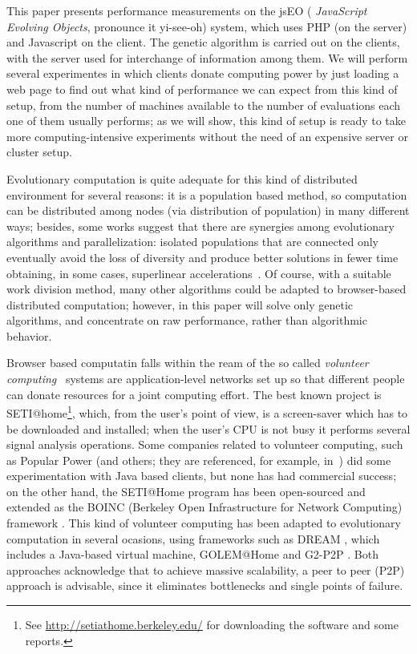 \documentclass{llncs}
\begin{document}
This paper presents performance measurements on the jsEO ({\em
  JavaScript Evolving Objects}, pronounce it yi-see-oh) system, which uses PHP 
 (on the server) and Javascript on the client. The genetic algorithm is carried out  on the clients,
with the server used  for interchange of information among
them. We will perform several experimentes in which clients donate
computing power by just loading a web page to find out what kind of
performance we can expect from this kind of setup, from the number of
machines available to the number of evaluations each one of them
usually performs; as we will show, this kind of setup is ready to take more
computing-intensive experiments without the need of an expensive server or cluster
setup. 

Evolutionary computation is quite adequate for this
kind of distributed environment for several reasons: it is a population based method,
so computation can be distributed among nodes (via distribution of
population) in many different ways;
besides, some works suggest that there are synergies among evolutionary
algorithms and parallelization: isolated populations that are
connected only eventually avoid the loss of diversity and produce
better solutions in fewer time obtaining, in some cases, superlinear
accelerations~\cite{cantu-paz:migration-policies}. Of course, with a suitable work division method, many other algorithms
could be adapted to browser-based distributed computation; however, in
this paper will solve only genetic algorithms, and concentrate on raw
performance, rather than algorithmic behavior. 

Browser based computatin falls within the ream of the so called  {\em volunteer
computing}~\cite{sarmenta-bayanihan,hpvc} systems are
application-level networks set up so that different people
can donate resources for a joint computing  effort.
The best known project is SETI@home\footnote{See
\url{http://setiathome.berkeley.edu/} for downloading the software  and some
reports.}, which, from the user's point of view, is a screen-saver which has to be
downloaded and installed; when the user's CPU is not busy it performs
several signal analysis operations.
Some companies related to volunteer computing, such as Popular Power (and
others; they are referenced,
for example, in~\cite{Cappello}) did some experimentation with Java based
clients, but none has had commercial success; on the other hand, the
SETI@Home program has been open-sourced and extended as the BOINC
(Berkeley Open Infrastructure for Network Computing) 
framework \cite{boinc_grid04}. This kind of volunteer computing has
been adapted to evolutionary computation in several ocasions, using
frameworks such as DREAM \cite{LNCS2439:ID197:pp665}, which includes a
Java-based virtual machine, GOLEM@Home and G2-P2P \cite{G2-P2P}. Both approaches
acknowledge that to achieve massive scalability, a peer to peer (P2P)
approach is advisable, since it eliminates bottlenecks and single
points of failure. 
\end{document}
